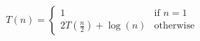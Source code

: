 \begin{equation}
    T(n) =
    \begin{cases}
        1 & \text{if } n = 1 \\
        2T\left(\frac{n}{2}\right) + \log(n) & \text{otherwise}
    \end{cases}
\end{equation}
